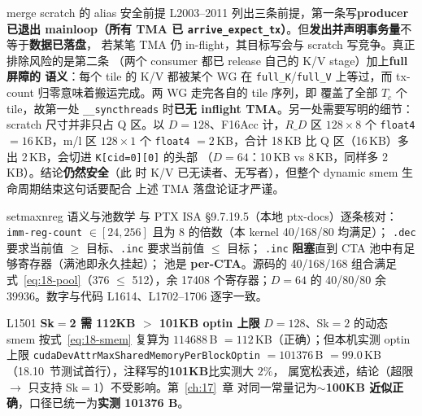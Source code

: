 \begin{kaogu}[F3·论证链补强]{merge scratch 的 alias 安全前提}
  L2003--2011 列出三条前提，第一条写\textbf{producer 已退出 mainloop（所有 TMA 已
  \texttt{arrive\_\allowbreak{}expect\_\allowbreak{}tx}）}。但\textbf{发出并声明事务量}不等于\textbf{数据已落盘}，
  若某笔 TMA 仍 in-flight，其目标写会与 scratch 写竞争。真正排除风险的是第二条
  （两个 consumer 都已 release 自己的 K/V stage）加上\textbf{full 屏障的
  语义}：每个 tile 的 K/V 都被某个 WG 在 \texttt{full\_K}/\texttt{full\_V}
  上等过，而 tx-count 归零意味着搬运完成。两 WG 走完各自的 tile 序列，即
  覆盖了全部 $T_c$ 个 tile，故第一处 \texttt{\_\allowbreak{}\_\allowbreak{}syncthreads} 时\textbf{已无
  inflight TMA}。另一处需要写明的细节：scratch 尺寸并非只占 Q 区。以
  $D{=}128$、F16Acc 计，$R\_D$ 区 $128 \times 8$ 个 \texttt{float4}
  $= 16$\,KB，m/l 区 $128 \times 1$ 个 \texttt{float4} $= 2$\,KB，合计
  18\,KB 比 Q 区（16\,KB）多出 2\,KB，会切进 \texttt{K[cid=0][0]} 的头部
  （$D{=}64$：10\,KB vs 8\,KB，同样多 2\,KB）。结论\textbf{仍然安全}（此
  时 K/V 已无读者、无写者），但整个 dynamic smem 生命周期结束这句话要配合
  上述 TMA 落盘论证才严谨。
\end{kaogu}

\begin{kaogu}[F2 核校通过]{setmaxnreg 语义与池数学}
  与 PTX ISA §9.7.19.5（本地 ptx-docs）逐条核对：\texttt{imm-reg-count}
  $\in [24, 256]$ 且为 8 的倍数（本 kernel 40/168/80 均满足）；
  \texttt{.dec} 要求当前值 $\ge$ 目标、\texttt{.inc} 要求当前值 $\le$ 目标；
  \texttt{.inc} \textbf{阻塞}直到 CTA 池中有足够寄存器（满池即永久挂起）；
  池是 \textbf{per-CTA}。源码的 40/168/168 组合满足
  式~\ref{eq:18-pool}（376 $\le$ 512），余 17408 个寄存器；$D{=}64$ 的
  40/80/80 余 39936。数字与代码 L1614、L1702--1706 逐字一致。
\end{kaogu}

\begin{kaogu}[F1·口径]{L1501 \textbf{Sk$=$2 需 112KB $>$ 101KB optin 上限}}
  $D{=}128$、Sk$=2$ 的动态 smem 按式~\ref{eq:18-smem} 复算为
  $114688$\,B $= 112$\,KB（正确）；但本机实测 optin 上限
  \texttt{cuda\allowbreak{}Dev\allowbreak{}Attr\allowbreak{}Max\allowbreak{}Shared\allowbreak{}Memory\allowbreak{}Per\allowbreak{}Block\allowbreak{}Optin} $= 101376$\,B
  $= 99.0$\,KB（18.10~节测试首行），注释写的\textbf{101KB}比实测大 $2\%$，
  属宽松表述，结论（超限 $\to$ 只支持 Sk$=$1）不受影响。第~\ref{ch:17}~章
  对同一常量记为\textbf{$\sim$100KB 近似正确}，口径已统一为\textbf{实测 101376 B}。
\end{kaogu}

